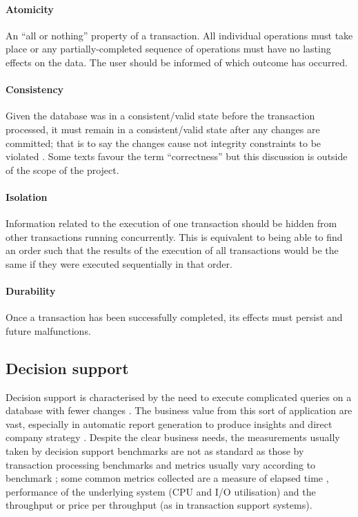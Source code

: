 \paragraph{Atomicity} An ``all or nothing'' property of a transaction. All
individual operations must take place or any partially-completed sequence of
operations must have no lasting effects on the data. The user should be informed
of which outcome has occurred.

\paragraph{Consistency} Given the database was in a consistent/valid state
before the transaction processed, it must remain in a consistent/valid state
after any changes are committed; that is to say the changes cause not integrity
constraints to be violated \cite{IntroToDatabaseSystems}. 
Some texts favour the term ``correctness'' \cite{IntroToDatabaseSystems} but this
discussion is outside of the scope of the project. 

\paragraph{Isolation} Information related to the execution of one transaction
should be hidden from other transactions running concurrently. This is
equivalent to being able to find an order such that the results of the execution
of all transactions would be the same if they were executed sequentially in that
order.

\paragraph{Durability} Once a transaction has been successfully completed, its
effects must persist and future malfunctions.

\subsection{Decision support}
Decision support is characterised by the need to execute complicated queries on
a database with fewer changes \cite{IntroToDatabaseSystems,
PractitionersIntroduction}. The business value from this sort of application are
vast, especially in automatic report generation to produce insights and direct
company strategy \cite{SetQueryBenchmark, IntroToDatabaseSystems}. Despite the
clear business needs, the measurements usually taken by decision support
benchmarks are not as standard as those by transaction processing benchmarks and
metrics usually vary according to benchmark 
\cite{PractitionersIntroduction}; some common metrics collected are a measure of
elapsed time \cite{Wisconsin, TPC-H, PractitionersIntroduction}, performance of
the underlying system (CPU and I/O utilisation) \cite{PractitionersIntroduction}
and the throughput or price per throughput \cite{TPC-H, SetQueryBenchmark,
PractitionersIntroduction} (as in transaction support systems). 

